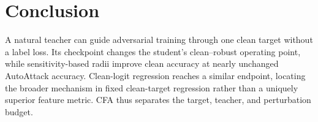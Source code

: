 \section{Conclusion}
\label{sec:conclusion}

A natural teacher can guide adversarial training through one clean target without a label loss.
Its checkpoint changes the student's clean--robust operating point, while sensitivity-based radii
improve clean accuracy at nearly unchanged AutoAttack accuracy. Clean-logit regression reaches a
similar endpoint, locating the broader mechanism in fixed clean-target regression rather than a
uniquely superior feature metric. CFA thus separates the target, teacher, and perturbation budget.
